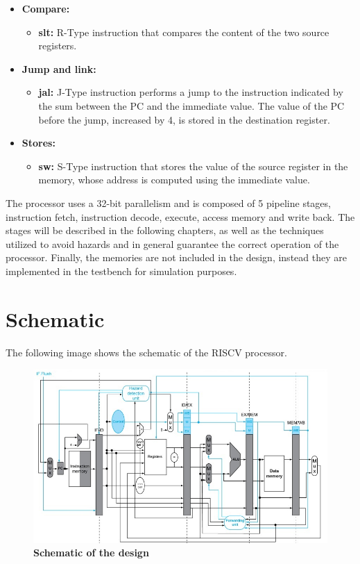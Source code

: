 \begin{itemize}
    \item \textbf{Compare:}
    \begin{itemize}
        \item \textbf{slt:} R-Type instruction that compares the content of the two source registers.
    \end{itemize}
    \item \textbf{Jump and link:}
    \begin{itemize}
        \item \textbf{jal:} J-Type instruction performs a jump to the instruction indicated by the sum between the PC and the immediate value. The value of the PC before the jump, 
        increased by 4, is stored in the destination register.
    \end{itemize}
    \item \textbf{Stores:}
    \begin{itemize}
        \item \textbf{sw:} S-Type instruction that stores the value of the source register in the memory, whose address is computed using the immediate value.
    \end{itemize}
\end{itemize}

The processor uses a 32-bit parallelism and is composed of 5 pipeline stages, instruction fetch, instruction decode, execute, access memory and write back.
The stages will be described in the following chapters, as well as the techniques utilized to avoid hazards and in general guarantee the correct operation of the processor. 
Finally, the memories are not included in the design, instead they are implemented in the testbench for simulation purposes.

\clearpage

\section{Schematic}

The following image shows the schematic of the RISCV processor.
\begin{figure}[!h]
    \centering
        \includegraphics[width=\linewidth]{schematic/schematic.jpg}
        \caption{\textbf{Schematic of the design}}
\end{figure}
        